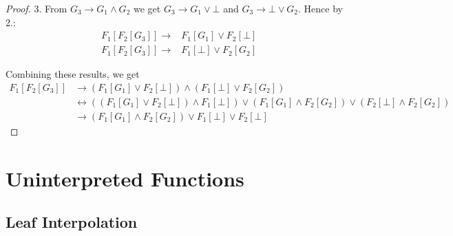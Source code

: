 \documentclass{llncs}
\begin{document}
\begin{proof}
  3. From $G_3\rightarrow G_1\land G_2$ we get 
  $G_3\rightarrow G_1 \lor \bot$ and $G_3 \rightarrow \bot \lor G_2$.  Hence by 2.:
  \begin{align*}
    F_1[F_2[G_3]] \rightarrow& F_1[G_1] \lor F_2[\bot]\\
    F_1[F_2[G_3]] \rightarrow& F_1[\bot] \lor F_2[G_2]
  \end{align*}

  Combining these results, we get
  \begin{align*}
    F_1[F_2[G_3]] &\rightarrow
    (F_1[G_1] \lor F_2[\bot]) \land (F_1[\bot] \lor F_2[G_2])\\
  &\leftrightarrow
  ((F_1[G_1] \lor F_2[\bot]) \land F_1[\bot]) \lor
  (F_1[G_1]\land F_2[G_2]) \lor (F_2[\bot] \land F_2[G_2]) \\
  &\rightarrow
  (F_1[G_1]\land F_2[G_2]) \lor F_1[\bot] \lor F_2[\bot] 
  \end{align*}
\end{proof}

\section{Uninterpreted Functions}

\subsection{Leaf Interpolation}
\end{document}
